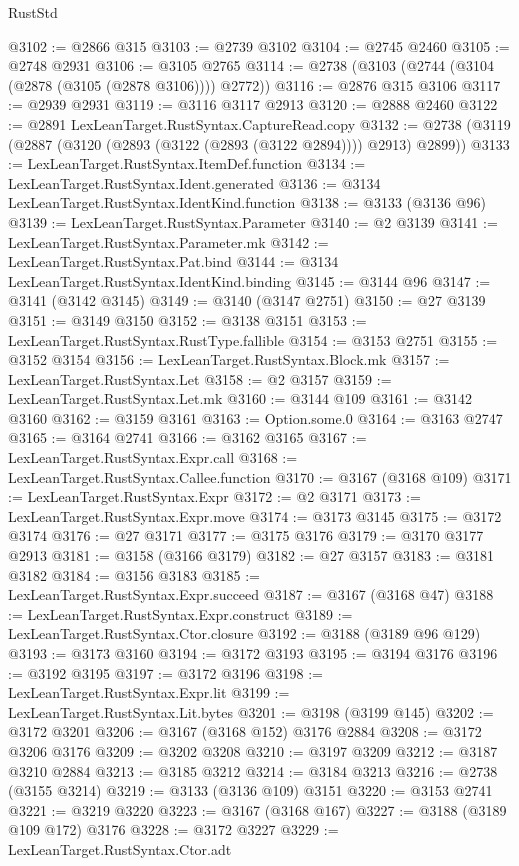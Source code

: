 \begin{lexlean}{RustStd}
\begin{coremodule}
@3102 := @2866 @315
@3103 := @2739 @3102
@3104 := @2745 @2460
@3105 := @2748 @2931
@3106 := @3105 @2765
@3114 := @2738 (@3103 (@2744 (@3104 (@2878 (@3105 (@2878 @3106)))) @2772))
@3116 := @2876 @315 @3106
@3117 := @2939 @2931
@3119 := @3116 @3117 @2913
@3120 := @2888 @2460
@3122 := @2891 LexLeanTarget.RustSyntax.CaptureRead.copy
@3132 := @2738 (@3119 (@2887 (@3120 (@2893 (@3122 (@2893 (@3122 @2894)))) @2913) @2899))
@3133 := LexLeanTarget.RustSyntax.ItemDef.function
@3134 := LexLeanTarget.RustSyntax.Ident.generated
@3136 := @3134 LexLeanTarget.RustSyntax.IdentKind.function
@3138 := @3133 (@3136 @96)
@3139 := LexLeanTarget.RustSyntax.Parameter
@3140 := @2 @3139
@3141 := LexLeanTarget.RustSyntax.Parameter.mk
@3142 := LexLeanTarget.RustSyntax.Pat.bind
@3144 := @3134 LexLeanTarget.RustSyntax.IdentKind.binding
@3145 := @3144 @96
@3147 := @3141 (@3142 @3145)
@3149 := @3140 (@3147 @2751)
@3150 := @27 @3139
@3151 := @3149 @3150
@3152 := @3138 @3151
@3153 := LexLeanTarget.RustSyntax.RustType.fallible
@3154 := @3153 @2751
@3155 := @3152 @3154
@3156 := LexLeanTarget.RustSyntax.Block.mk
@3157 := LexLeanTarget.RustSyntax.Let
@3158 := @2 @3157
@3159 := LexLeanTarget.RustSyntax.Let.mk
@3160 := @3144 @109
@3161 := @3142 @3160
@3162 := @3159 @3161
@3163 := Option.some.{0}
@3164 := @3163 @2747
@3165 := @3164 @2741
@3166 := @3162 @3165
@3167 := LexLeanTarget.RustSyntax.Expr.call
@3168 := LexLeanTarget.RustSyntax.Callee.function
@3170 := @3167 (@3168 @109)
@3171 := LexLeanTarget.RustSyntax.Expr
@3172 := @2 @3171
@3173 := LexLeanTarget.RustSyntax.Expr.move
@3174 := @3173 @3145
@3175 := @3172 @3174
@3176 := @27 @3171
@3177 := @3175 @3176
@3179 := @3170 @3177 @2913
@3181 := @3158 (@3166 @3179)
@3182 := @27 @3157
@3183 := @3181 @3182
@3184 := @3156 @3183
@3185 := LexLeanTarget.RustSyntax.Expr.succeed
@3187 := @3167 (@3168 @47)
@3188 := LexLeanTarget.RustSyntax.Expr.construct
@3189 := LexLeanTarget.RustSyntax.Ctor.closure
@3192 := @3188 (@3189 @96 @129)
@3193 := @3173 @3160
@3194 := @3172 @3193
@3195 := @3194 @3176
@3196 := @3192 @3195
@3197 := @3172 @3196
@3198 := LexLeanTarget.RustSyntax.Expr.lit
@3199 := LexLeanTarget.RustSyntax.Lit.bytes
@3201 := @3198 (@3199 @145)
@3202 := @3172 @3201
@3206 := @3167 (@3168 @152) @3176 @2884
@3208 := @3172 @3206 @3176
@3209 := @3202 @3208
@3210 := @3197 @3209
@3212 := @3187 @3210 @2884
@3213 := @3185 @3212
@3214 := @3184 @3213
@3216 := @2738 (@3155 @3214)
@3219 := @3133 (@3136 @109) @3151
@3220 := @3153 @2741
@3221 := @3219 @3220
@3223 := @3167 (@3168 @167)
@3227 := @3188 (@3189 @109 @172) @3176
@3228 := @3172 @3227
@3229 := LexLeanTarget.RustSyntax.Ctor.adt

\end{coremodule}
\end{lexlean}
